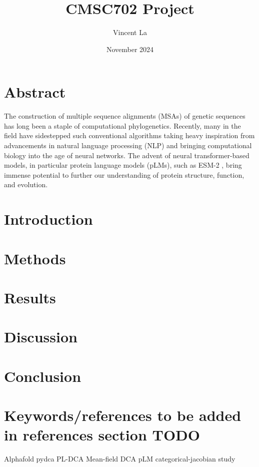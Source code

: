 \documentclass{article}
\title{CMSC702 Project}
\author{Vincent La}
\date{November 2024}
\begin{document}
\maketitle


\section{Abstract}
The construction of multiple sequence alignments (MSAs) of genetic sequences has long been a staple of computational phylogenetics. Recently, many in the field have sidestepped such conventional algorithms taking heavy inspiration from advancements in natural language processing (NLP) and bringing computational biology into the age of neural networks. The advent of neural transformer-based models, in particular protein language models (pLMs), such as ESM-2 \cite{ESM-FOLD}, bring immense potential to further our understanding of protein structure, function, and evolution. \\

\section{Introduction}


\section{Methods}

\section{Results}

\section{Discussion}

\section{Conclusion}

\section{Keywords/references to be added in references section TODO}
Alphafold \cite{AlphaFold}
pydca \cite{pydca}
PL-DCA \cite{Ekeberg}
Mean-field DCA \cite{Morcos}
pLM categorical-jacobian study \cite{Zhang}




\end{document}

